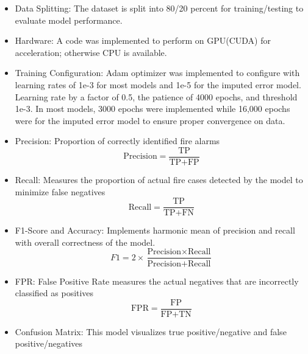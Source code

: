 \documentclass[conference]{IEEEtran}
\begin{document}
\begin{itemize}
\item Data Splitting: The dataset is split into 80/20
percent for training/testing to evaluate model performance. 
\item Hardware: A code was implemented to perform on
GPU(CUDA) for acceleration; otherwise CPU is available. 
\item Training Configuration: Adam optimizer was implemented
to configure with learning rates of 1e-3 for most models and
1e-5 for the imputed error model. Learning rate by a factor
of 0.5, the patience of 4000 epochs, and threshold 1e-3. In
most models, 3000 epochs were implemented while 16,000
epochs were for the imputed error model to ensure proper
convergence on data. 
\item Precision: Proportion of correctly identified fire
alarms 
\begin{equation}
    \text{Precision} = \frac{\text{TP}}{\text{TP} + \text{FP}}
\end{equation}
\item Recall: Measures the proportion of actual fire cases
detected by the model to minimize false negatives
\begin{equation}
    \text{Recall} = \frac{\text{TP}}{\text{TP} + \text{FN}}
\end{equation}
\item F1-Score and Accuracy: Implements harmonic mean of
precision and recall with overall correctness of the model.
\begin{equation}
    F1 = 2 \times \frac{\text{Precision} \times \text{Recall}}{\text{Precision} + \text{Recall}}
\end{equation}
\item FPR: False Positive Rate measures the actual negatives
that are incorrectly classified as positives 
\begin{equation}
    \text{FPR} = \frac{\text{FP}}{\text{FP} + \text{TN}}
\end{equation}
\item Confusion Matrix: This model visualizes true
positive/negative and false positive/negatives
\end{itemize}
\end{document}
